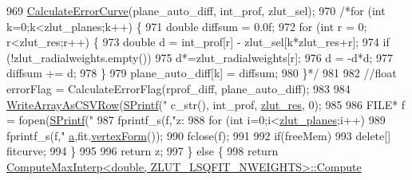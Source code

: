 \begin{DoxyCode}
{{{{{{969                 \hyperlink{class_c_p_u_tracker_a3505604c838186c348562bac8a2fedfe}{CalculateErrorCurve}(plane\_auto\_diff, int\_prof, zlut\_sel);
970                 \textcolor{comment}{/*for (int k=0;k<zlut\_planes;k++) \{}
971 \textcolor{comment}{                    double diffsum = 0.0f;}
972 \textcolor{comment}{                    for (int r = 0; r<zlut\_res;r++) \{}
973 \textcolor{comment}{                        double d = int\_prof[r] - zlut\_sel[k*zlut\_res+r];}
974 \textcolor{comment}{                        if (!zlut\_radialweights.empty())}
975 \textcolor{comment}{                            d*=zlut\_radialweights[r];}
976 \textcolor{comment}{                        d = -d*d;}
977 \textcolor{comment}{                        diffsum += d;}
978 \textcolor{comment}{                    \}}
979 \textcolor{comment}{                    plane\_auto\_diff[k] = diffsum;}
980 \textcolor{comment}{                \}*/}
981 
982                 \textcolor{comment}{//float errorFlag = CalculateErrorFlag(rprof\_diff, plane\_auto\_diff);}
983 
984                 \hyperlink{utils_8cpp_aa0fb8da4922e3042928ed9f6388bc09a}{WriteArrayAsCSVRow}(\hyperlink{utils_8cpp_aba26a6b64035ef7962a63b760dd9013e}{SPrintf}(\textcolor{stringliteral}{"%
      c\_str(), int\_prof, \hyperlink{class_c_p_u_tracker_a058eae282c9bf847cd8e39664688c5bc}{zlut\_res}, 0);
985 
986                 FILE* f = fopen(\hyperlink{utils_8cpp_aba26a6b64035ef7962a63b760dd9013e}{SPrintf}(\textcolor{stringliteral}{"%
987                 fprintf\_s(f,\textcolor{stringliteral}{"z: %
988                 \textcolor{keywordflow}{for} (\textcolor{keywordtype}{int} i=0;i<\hyperlink{class_c_p_u_tracker_ad28d60ad587ae3f89b9dba7f82c135f7}{zlut\_planes};i++)
989                     fprintf\_s(f,\textcolor{stringliteral}{"%
      \hyperlink{class_lsq_sq_quad_fit_aed5761aec0a7a0f48c00668e07018f5f}{a},fit.\hyperlink{class_lsq_sq_quad_fit_a1d893652bce7f1438a4ad48e937f5405}{vertexForm}());
990                 fclose(f);
991 
992                 \textcolor{keywordflow}{if}(freeMem)
993                     \textcolor{keyword}{delete}[] fitcurve;
994             \}
995             
996             \textcolor{keywordflow}{return} z;
997         \} \textcolor{keywordflow}{else} \{
998             \textcolor{keywordflow}{return} \hyperlink{class_compute_max_interp_aa1ec2481d8a866f624f05ba53fb2d3bc}{ComputeMaxInterp<double, ZLUT\_LSQFIT\_NWEIGHTS>::Compute}
}}}}}}}}}}
\end{DoxyCode}
